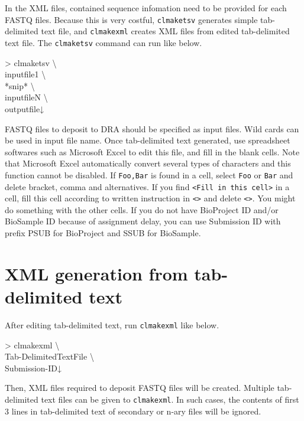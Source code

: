 \documentclass[titlepage,10pt,a4paper,english]{jsbook}
\newenvironment{cmd}{\begin{oframed}\raggedright\ttfamily\footnotesize\setlength{\baselineskip}{1.4em}}{\end{oframed}\vspace{-1em}}
\begin{document}
In the XML files, contained sequence infomation need to be provided for each FASTQ files.
Because this is very costful, \texttt{clmaketsv} generates simple tab-delimited text file, and \texttt{clmakexml} creates XML files from edited tab-delimited text file.
The \texttt{clmaketsv} command can run like below.

\begin{cmd}
{\textgreater} clmaketsv {\textbackslash}\\
inputfile1 {\textbackslash}\\
*snip* {\textbackslash}\\
inputfileN {\textbackslash}\\
outputfile↓
\end{cmd}

FASTQ files to deposit to DRA should be specified as input files.
Wild cards can be used in input file name.
Once tab-delimited text generated, use spreadsheet softwares such as Microsoft Excel to edit this file, and fill in the blank cells.
Note that Microsoft Excel automatically convert several types of characters and this function cannot be disabled.
If \texttt{{\lbrack}Foo,Bar{\rbrack}} is found in a cell, select \texttt{Foo} or \texttt{Bar} and delete bracket, comma and alternatives.
If you find \texttt{{\textless}Fill in this cell{\textgreater}} in a cell, fill this cell according to written instruction in \texttt{{\textless}{\textgreater}} and delete \texttt{{\textless}{\textgreater}}.
You might do something with the other cells.
If you do not have BioProject ID and/or BioSample ID because of assignment delay, you can use Submission ID with prefix PSUB for BioProject and SSUB for BioSample.

\section{XML generation from tab-delimited text}

After editing tab-delimited text, run \texttt{clmakexml} like below.

\begin{cmd}
{\textgreater} clmakexml {\textbackslash}\\
Tab-DelimitedTextFile {\textbackslash}\\
Submission-ID↓
\end{cmd}

Then, XML files required to deposit FASTQ files will be created.
Multiple tab-delimited text files can be given to \texttt{clmakexml}.
In such cases, the contents of first 3 lines in tab-delimited text of secondary or n-ary files will be ignored.
\end{document}
